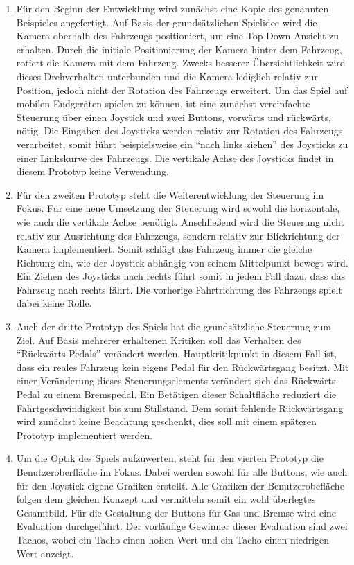 	\begin{enumerate}[label=Prototyp \arabic*]
		\item{ Für den Beginn der Entwicklung wird zunächst eine Kopie des genannten Beispieles angefertigt. Auf Basis der grundsätzlichen Spielidee wird die Kamera oberhalb des Fahrzeugs positioniert, um eine Top-Down Ansicht zu erhalten. Durch die initiale Positionierung der Kamera hinter dem Fahrzeug, rotiert die Kamera mit dem Fahrzeug. Zwecks besserer Übersichtlichkeit wird dieses Drehverhalten unterbunden und die Kamera lediglich relativ zur Position, jedoch nicht der Rotation des Fahrzeugs erweitert. Um das Spiel auf mobilen Endgeräten spielen zu können, ist eine zunächst vereinfachte Steuerung über einen Joystick und zwei Buttons, vorwärts und rückwärts, nötig. Die Eingaben des Joysticks werden relativ zur Rotation des Fahrzeugs verarbeitet, somit führt beispielsweise ein \enquote{nach links ziehen} des Joysticks zu einer Linkskurve des Fahrzeugs. Die vertikale Achse des Joysticks findet in diesem Prototyp keine Verwendung. }
		\item{ Für den zweiten Prototyp steht die Weiterentwicklung der Steuerung im Fokus. Für eine neue Umsetzung der Steuerung wird sowohl die horizontale, wie auch die vertikale Achse benötigt. Anschließend wird die Steuerung nicht relativ zur Ausrichtung des Fahrzeugs, sondern relativ zur Blickrichtung der Kamera implementiert. Somit schlägt das Fahrzeug immer die gleiche Richtung ein, wie der Joystick abhängig von seinem Mittelpunkt bewegt wird. Ein Ziehen des Joysticks nach rechts führt somit in jedem Fall dazu, dass das Fahrzeug nach rechts fährt. Die vorherige Fahrtrichtung des Fahrzeugs spielt dabei keine Rolle. }
		\item{ Auch der dritte Prototyp des Spiels hat die grundsätzliche Steuerung zum Ziel. Auf Basis mehrerer erhaltenen Kritiken soll das Verhalten des \enquote{Rückwärts-Pedals} verändert werden. Hauptkritikpunkt in diesem Fall ist, dass ein reales Fahrzeug kein eigens Pedal für den Rückwärtsgang besitzt. Mit einer Veränderung dieses Steuerungselements verändert sich das Rückwärts-Pedal zu einem Bremspedal. Ein Betätigen dieser Schaltfläche reduziert die Fahrtgeschwindigkeit bis zum Stillstand. Dem somit fehlende Rückwärtsgang wird zunächst keine Beachtung geschenkt, dies soll mit einem späteren Prototyp implementiert werden.}
		\item{ Um die Optik des Spiels aufzuwerten, steht für den vierten Prototyp die Benutzeroberfläche im Fokus. Dabei werden sowohl für alle Buttons, wie auch für den Joystick eigene Grafiken erstellt. Alle Grafiken der Benutzerobefläche folgen dem gleichen Konzept und vermitteln somit ein wohl überlegtes Gesamtbild. Für die Gestaltung der Buttons für Gas und Bremse wird eine Evaluation durchgeführt. Der vorläufige Gewinner dieser Evaluation sind zwei Tachos, wobei ein Tacho einen hohen Wert und ein Tacho einen niedrigen Wert anzeigt. }

\end{enumerate}
